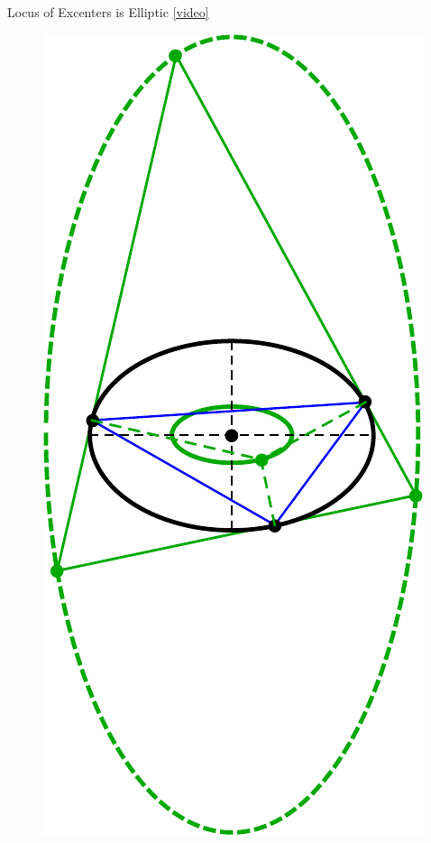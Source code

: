 \begin{frame}{Locus of Excenters is Elliptic \href{https://youtu.be/Xxr1DUo19_w}{[video]}}
\begin{figure}
\includegraphics[clip,trim={0 4cm 0 0},height=.8\textheight]{pics/0025_incenter_excenter_locus.pdf}
\end{figure}
\end{frame}


